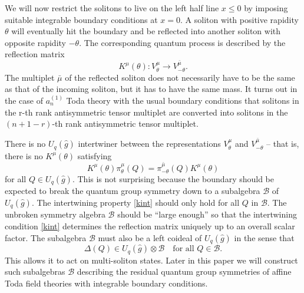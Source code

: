 \documentclass[a4paper,12pt]{article}
\newcommand{\uqgh}{U_q(\hat{g})}
\newcommand{\mub}{\bar{\mu}}
\newcommand{\sa}{{\mathcal{B}}}
\numberwithin{equation}{section}
\begin{document}
We will now restrict the solitons to live on the left half line
$x\leq 0$ by imposing suitable integrable boundary conditions at
$x=0$. A soliton with positive rapidity $\theta$ will eventually
hit the boundary and be reflected into another soliton with
opposite rapidity $-\theta$. The corresponding quantum process is
described by the reflection matrix
\begin{equation}
  K^\mu(\theta): V^\mu_\theta\rightarrow V^{\mub}_{-\theta}.
\end{equation}
The multiplet $\mub$ of the reflected soliton does not necessarily
have to be the same as that of the incoming soliton, but it has to
have the same mass. It turns out \cite{Del98a} in the case of
$a_n^{(1)}$ Toda theory with the usual boundary conditions that
solitons in the r-th rank antisymmetric tensor multiplet are
converted into solitons in the $(n+1-r)$-th rank antisymmetric
tensor multiplet.

There is no $\uqgh$ intertwiner between the representations
$V^\mu_\theta$ and $V^{\mub}_{-\theta}$ -- that is, there is no
$K^\mu(\theta)$ satisfying
\begin{equation}\label{kint}
  K^\mu(\theta)\pi^\mu_\theta(Q)=\pi^{\mub}_{-\theta}(Q)K^\mu(\theta)
\end{equation}
for all $Q\in\uqgh$. This is not surprising because the boundary
should be expected to break the quantum group symmetry down to a
subalgebra $\sa$ of $\uqgh$. The intertwining property
\eqref{kint} should only hold for all $Q$ in $\sa$. The unbroken
symmetry algebra $\sa$ should be ``large enough'' so that the
intertwining condition \eqref{kint} determines the reflection
matrix uniquely up to an overall scalar factor. The subalgebra
$\sa$ must also be a left coideal of $\uqgh$ in the sense that
\begin{equation}
  \Delta(Q)\in\uqgh\otimes\sa~~~\text{ for all }Q\in\sa.
\end{equation}
This allows it to act on multi-soliton states. Later in this paper
we will construct such subalgebras $\sa$ describing the residual
quantum group symmetries of affine Toda field theories with
integrable boundary conditions.
\end{document}
